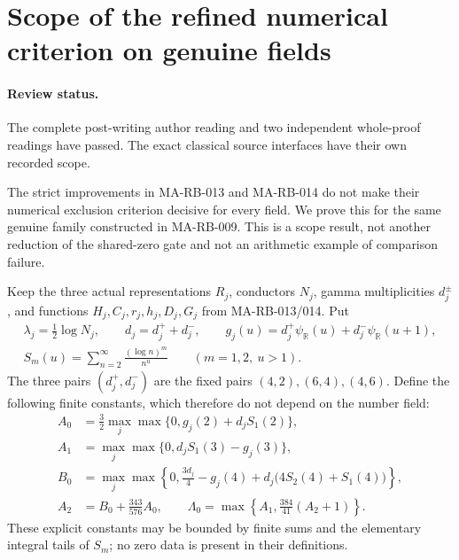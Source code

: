 \section{Scope of the refined numerical criterion on genuine fields}
\label{sec:s5-nonreal-scope}

\paragraph{Review status.}
The complete post-writing author reading and two independent
whole-proof readings have passed. The exact classical source
interfaces have their own recorded scope.

The strict improvements in MA-RB-013 and MA-RB-014 do not make
their numerical exclusion criterion decisive for every field.
We prove this for the same genuine family constructed in
MA-RB-009. This is a scope result, not another reduction of
the shared-zero gate and not an arithmetic example of
comparison failure.

Keep the three actual representations \(R_j\), conductors
\(N_j\), gamma multiplicities \(d_j^\pm\), and functions
\(H_j,C_j,r_j,h_j,D_j,G_j\) from MA-RB-013/014. Put
\[
 \begin{gathered}
  \lambda_j=\frac12\log N_j,\qquad d_j=d_j^++d_j^-,\qquad
  g_j(u)=d_j^+\psi_{\mathbb R}(u)
                       +d_j^-\psi_{\mathbb R}(u+1),\\
  S_m(u)=\sum_{n=2}^{\infty}\frac{(\log n)^m}{n^u}
                                \qquad(m=1,2,\ u>1).
 \end{gathered}
 \tag{MA-RB.280}
\]
The three pairs \((d_j^+,d_j^-)\) are the fixed pairs
\((4,2),(6,4),(4,6)\). Define the following finite constants,
which therefore do not depend on the number field:
\[
 \begin{aligned}
 A_0&=\frac32\max_j\max\{0,g_j(2)+d_jS_1(2)\},\\
 A_1&=\max_j\max\{0,d_jS_1(3)-g_j(3)\},\\
 B_0&=\max_j\max\left\{0,\frac{3d_j}{4}-g_j(4)
                         +d_j\bigl(4S_2(4)+S_1(4)\bigr)\right\},\\
 A_2&=B_0+\frac{343}{576}A_0,\qquad
 \Lambda_0=\max\left\{A_1,\frac{384}{41}(A_2+1)\right\}.
 \end{aligned}
 \tag{MA-RB.281}
\]
These explicit constants may be bounded by finite sums and
the elementary integral tails of \(S_m\); no zero data
is present in their definitions.

